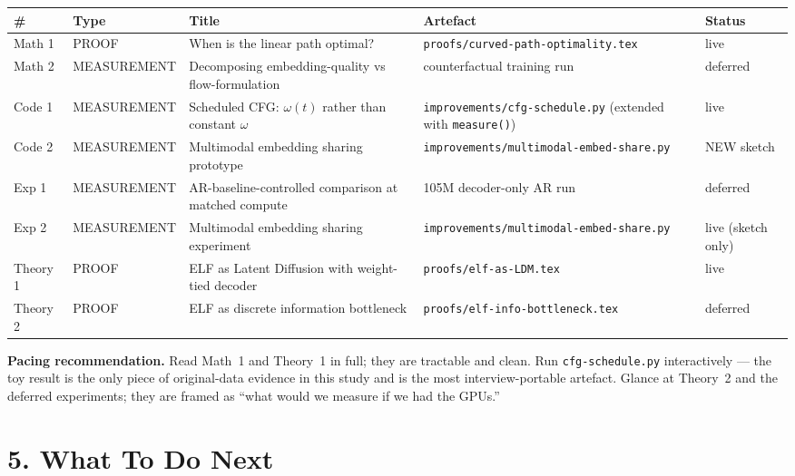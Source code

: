 \documentclass[11pt]{article}
\begin{document}
\begin{longtable}{p{}p{}p{}p{}p{}}
\toprule
\textbf{\#} & \textbf{Type} & \textbf{Title} & \textbf{Artefact} & \textbf{Status} \\
\midrule
\endhead
Math 1 & PROOF & When is the linear path optimal? & \texttt{proofs/curved-path-optimality.tex} & live \\
Math 2 & MEASUREMENT & Decomposing embedding-quality vs flow-formulation & counterfactual training run & deferred \\
Code 1 & MEASUREMENT & Scheduled CFG: $\omega(t)$ rather than constant $\omega$ & \texttt{improvements/cfg-schedule.py} (extended with \texttt{measure()}) & live \\
Code 2 & MEASUREMENT & Multimodal embedding sharing prototype & \texttt{improvements/multimodal-embed-share.py} & NEW sketch \\
Exp 1 & MEASUREMENT & AR-baseline-controlled comparison at matched compute & 105M decoder-only AR run & deferred \\
Exp 2 & MEASUREMENT & Multimodal embedding sharing experiment & \texttt{improvements/multimodal-embed-share.py} & live (sketch only) \\
Theory 1 & PROOF & ELF as Latent Diffusion with weight-tied decoder & \texttt{proofs/elf-as-LDM.tex} & live \\
Theory 2 & PROOF & ELF as discrete information bottleneck & \texttt{proofs/elf-info-bottleneck.tex} & deferred \\
\bottomrule
\end{longtable}

\textbf{Pacing recommendation.} Read Math~1 and Theory~1 in full; they are tractable and clean. Run \texttt{cfg-schedule.py} interactively --- the toy result is the only piece of original-data evidence in this study and is the most interview-portable artefact. Glance at Theory~2 and the deferred experiments; they are framed as ``what would we measure if we had the GPUs.''

\section*{5. What To Do Next}
\end{document}
